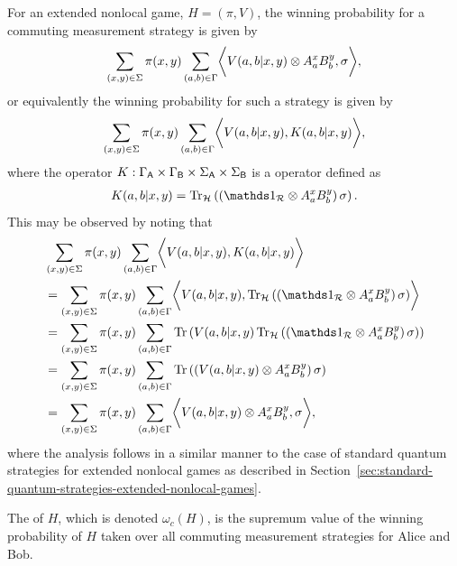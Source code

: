 For an extended nonlocal game, $H = (\pi,V)$, the winning probability for a commuting measurement strategy is given by 
\begin{align}
	\sum_{(x,y) \in \Sigma} \pi(x,y) \sum_{(a,b) \in \Gamma} \biggl\langle V(a,b|x,y) \otimes A_a^x B_b^y, \sigma \biggr\rangle,
\end{align}
or equivalently the winning probability for such a strategy is given by 
\begin{align}
	\sum_{(x,y) \in \Sigma} \pi(x,y) \sum_{(a,b) \in \Gamma} \biggl\langle V(a,b|x,y), K(a,b|x,y) \biggr\rangle,
\end{align}
where the operator $K : \Gamma_{\mathsf{A}} \times \Gamma_{\mathsf{B}} \times \Sigma_{\mathsf{A}} \times \Sigma_{\mathsf{B}}$ is a  operator defined as 
\begin{align}
	K(a,b|x,y) = \tr_{\H} \left( \left( \I_{\R} \otimes A_a^x B_b^y  \right) \sigma \right).
\end{align}
This may be observed by noting that
\begin{align}
	 &\sum_{(x,y) \in \Sigma} \pi(x,y) \sum_{(a,b) \in \Gamma} \biggip{V(a,b|x,y)}{K(a,b|x,y)} \\
	 &=\sum_{(x,y) \in \Sigma} \pi(x,y) \sum_{(a,b) \in \Gamma} \biggip{V(a,b|x,y)}{\tr_{\H} \left( \left( \I_{\R} \otimes A_a^x B_b^y \right) \sigma \right)} \\
	 &=\sum_{(x,y) \in \Sigma} \pi(x,y) \sum_{(a,b) \in \Gamma} \tr \left( V(a,b|x,y) \tr_{\H} \left( \left( \I_{\R} \otimes A_a^x B_b^y  \right) \sigma \right) \right)  \label{eq:ip-to-tr-1-com} \\
	 &=\sum_{(x,y) \in \Sigma} \pi(x,y) \sum_{(a,b) \in \Gamma} \tr \left( \left( V(a,b|x,y) \otimes A_a^x B_b^y \right) \sigma \right) \label{eq:factor-out-pt-com} \\
	 &=\sum_{(x,y) \in \Sigma} \pi(x,y) \sum_{(a,b) \in \Gamma} \biggip{V(a,b|x,y) \otimes A_a^x B_b^y  }{\sigma}, \label{eq:ip-to-tr-2-com}
\end{align}
where the analysis follows in a similar manner to the case of standard quantum strategies for extended nonlocal games as described in Section~\ref{sec:standard-quantum-strategies-extended-nonlocal-games}. 

The  of $H$, which is denoted $\omega_c(H)$, is the supremum value of the winning probability of $H$ taken over all commuting measurement strategies for Alice and Bob. 


